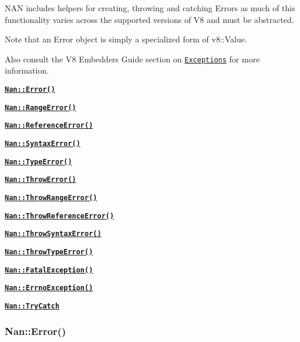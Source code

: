 N\+AN includes helpers for creating, throwing and catching Errors as much of this functionality varies across the supported versions of V8 and must be abstracted.

Note that an Error object is simply a specialized form of {\ttfamily v8\+::\+Value}.

Also consult the V8 Embedders Guide section on \href{https://developers.google.com/v8/embed#exceptions}{\tt Exceptions} for more information.


\begin{DoxyItemize}
\item \href{#api_nan_error}{\tt {\bfseries {\ttfamily Nan\+::\+Error()}}}
\item \href{#api_nan_range_error}{\tt {\bfseries {\ttfamily Nan\+::\+Range\+Error()}}}
\item \href{#api_nan_reference_error}{\tt {\bfseries {\ttfamily Nan\+::\+Reference\+Error()}}}
\item \href{#api_nan_syntax_error}{\tt {\bfseries {\ttfamily Nan\+::\+Syntax\+Error()}}}
\item \href{#api_nan_type_error}{\tt {\bfseries {\ttfamily Nan\+::\+Type\+Error()}}}
\item \href{#api_nan_throw_error}{\tt {\bfseries {\ttfamily Nan\+::\+Throw\+Error()}}}
\item \href{#api_nan_throw_range_error}{\tt {\bfseries {\ttfamily Nan\+::\+Throw\+Range\+Error()}}}
\item \href{#api_nan_throw_reference_error}{\tt {\bfseries {\ttfamily Nan\+::\+Throw\+Reference\+Error()}}}
\item \href{#api_nan_throw_syntax_error}{\tt {\bfseries {\ttfamily Nan\+::\+Throw\+Syntax\+Error()}}}
\item \href{#api_nan_throw_type_error}{\tt {\bfseries {\ttfamily Nan\+::\+Throw\+Type\+Error()}}}
\item \href{#api_nan_fatal_exception}{\tt {\bfseries {\ttfamily Nan\+::\+Fatal\+Exception()}}}
\item \href{#api_nan_errno_exception}{\tt {\bfseries {\ttfamily Nan\+::\+Errno\+Exception()}}}
\item \href{#api_nan_try_catch}{\tt {\bfseries {\ttfamily Nan\+::\+Try\+Catch}}}
\end{DoxyItemize}

\label{_api_nan_error}%
 \subsubsection*{Nan\+::\+Error()}

